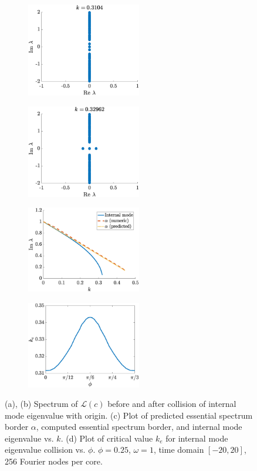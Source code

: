 \documentclass[11pt,reqno]{amsart}
\def\calL{{\mathcal L}}
\begin{document}
\begin{figure}
    \centering
    \begin{subfigure}{0.4\linewidth}
        \caption{}
        \label{fig:phi0speca}
        \includegraphics[width=5cm]{phi025spec2.eps}
    \end{subfigure}
    \begin{subfigure}{0.4\linewidth}
        \caption{}
        \label{fig:phi0specb}
        \includegraphics[width=5cm]{phi025spec3.eps}
    \end{subfigure}
    \begin{subfigure}{0.4\linewidth}
        \caption{}
        \label{fig:phi0specc}
        \includegraphics[width=5cm]{phi025speck.eps}
    \end{subfigure}
    \begin{subfigure}{0.4\linewidth}
        \caption{}
        \label{fig:phi0specd}
        \includegraphics[width=5cm]{keplot.eps}
    \end{subfigure}

    \caption{(a), (b) Spectrum of $\calL(c)$ before and after collision of internal mode eigenvalue with origin. (c) Plot of predicted essential spectrum border $\alpha$, computed essential spectrum border, and internal mode eigenvalue vs. $k$. (d) Plot of critical value $k_e$ for internal mode eigenvalue collision vs. $\phi$. $\phi = 0.25$, $\omega=1$, time domain $[-20,20]$, 256 Fourier nodes per core.}
    \label{fig:phi0spec}
\end{figure}
\end{document}
